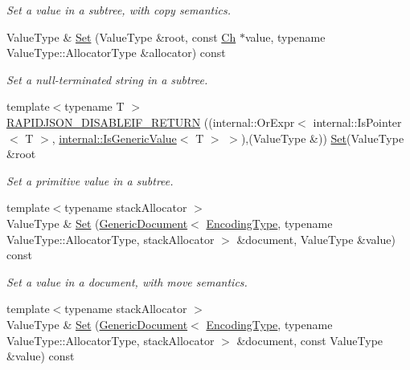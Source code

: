 \begin{DoxyCompactItemize}
\begin{DoxyCompactList}\small\item\em Set a value in a subtree, with copy semantics. \end{DoxyCompactList}\item 
Value\+Type \& \hyperlink{class_generic_pointer_ae62ceea598633d21ad648b431b23c26a}{Set} (Value\+Type \&root, const \hyperlink{class_generic_pointer_ab292356c11b4015c98d21b966b11f285}{Ch} $\ast$value, typename Value\+Type\+::\+Allocator\+Type \&allocator) const \hypertarget{class_generic_pointer_ae62ceea598633d21ad648b431b23c26a}{}\label{class_generic_pointer_ae62ceea598633d21ad648b431b23c26a}

\begin{DoxyCompactList}\small\item\em Set a null-\/terminated string in a subtree. \end{DoxyCompactList}\item 
{\footnotesize template$<$typename T $>$ }\\\hyperlink{class_generic_pointer_a914bbdd96e2a248e035b8ebd68526369}{R\+A\+P\+I\+D\+J\+S\+O\+N\+\_\+\+D\+I\+S\+A\+B\+L\+E\+I\+F\+\_\+\+R\+E\+T\+U\+RN} ((internal\+::\+Or\+Expr$<$ internal\+::\+Is\+Pointer$<$ T $>$, \hyperlink{structinternal_1_1_is_generic_value}{internal\+::\+Is\+Generic\+Value}$<$ T $>$ $>$),(Value\+Type \&)) \hyperlink{class_generic_pointer_adf0aa776e072b41d301e2a834ac2c2b5}{Set}(Value\+Type \&root
\begin{DoxyCompactList}\small\item\em Set a primitive value in a subtree. \end{DoxyCompactList}\item 
{\footnotesize template$<$typename stack\+Allocator $>$ }\\Value\+Type \& \hyperlink{class_generic_pointer_a49e879bd98bddbe7300f152a070d5604}{Set} (\hyperlink{class_generic_document}{Generic\+Document}$<$ \hyperlink{class_generic_pointer_a4b802da797a7a0b615fd9611cedb7c3b}{Encoding\+Type}, typename Value\+Type\+::\+Allocator\+Type, stack\+Allocator $>$ \&document, Value\+Type \&value) const \hypertarget{class_generic_pointer_a49e879bd98bddbe7300f152a070d5604}{}\label{class_generic_pointer_a49e879bd98bddbe7300f152a070d5604}

\begin{DoxyCompactList}\small\item\em Set a value in a document, with move semantics. \end{DoxyCompactList}\item 
{\footnotesize template$<$typename stack\+Allocator $>$ }\\Value\+Type \& \hyperlink{class_generic_pointer_afa59f450284e5cc6f989dab4b8344168}{Set} (\hyperlink{class_generic_document}{Generic\+Document}$<$ \hyperlink{class_generic_pointer_a4b802da797a7a0b615fd9611cedb7c3b}{Encoding\+Type}, typename Value\+Type\+::\+Allocator\+Type, stack\+Allocator $>$ \&document, const Value\+Type \&value) const \hypertarget{class_generic_pointer_afa59f450284e5cc6f989dab4b8344168}{}\label{class_generic_pointer_afa59f450284e5cc6f989dab4b8344168}


\end{DoxyCompactItemize}
